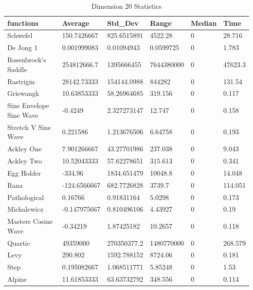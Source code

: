 \documentclass[12pt]{article}
\begin{document}
		\begin{table}[h]
			\centering
			\caption{Dimension 20 Statistics}
			\begin{tabular}{llllll} 
				\hline
				\textbf{functions}      & \textbf{Average} & \textbf{Std\_Dev} & \textbf{Range} & \textbf{Median} & \textbf{Time}  \\ 
				\hline
				Schwefel                & 150.7426667      & 825.6515891       & 4522.28        & 0               & 28.716         \\
				De Jong 1               & 0.001999083      & 0.01094943        & 0.0599725      & 0               & 1.783          \\
				Rosenbrock's Saddle     & 254812666.7      & 1395666455        & 7644380000     & 0               & 47623.3        \\
				Rastrigin               & 28142.73333      & 154144.0988       & 844282         & 0               & 131.54         \\
				Griewangk               & 10.63853333      & 58.26964685       & 319.156        & 0               & 0.117          \\
				Sine Envelope Sine Wave & -0.4249          & 2.327273147       & 12.747         & 0               & 0.158          \\
				Stretch V Sine Wave     & 0.221586         & 1.213676506       & 6.64758        & 0               & 0.193          \\
				Ackley One              & 7.901266667      & 43.27701986       & 237.038        & 0               & 9.043          \\
				Ackley Two              & 10.52043333      & 57.62278651       & 315.613        & 0               & 0.341          \\
				Egg Holder              & -334.96          & 1834.651479       & 10048.8        & 0               & 14.048         \\
				Rana                    & -124.6566667     & 682.7726828       & 3739.7         & 0               & 114.051        \\
				Pathological            & 0.16766          & 0.91831164        & 5.0298         & 0               & 0.173          \\
				Michalewicz             & -0.147975667     & 0.810496106       & 4.43927        & 0               & 0.19           \\
				Masters Cosine Wave  & -0.34219         & 1.87425182        & 10.2657        & 0               & 0.118          \\
				Quartic                 & 49359000         & 270350377.2       & 1480770000     & 0               & 268.579        \\
				Levy                    & 290.802          & 1592.788152       & 8724.06        & 0               & 0.181          \\
				Step                    & 0.195082667      & 1.068511771       & 5.85248        & 0               & 1.53           \\
				Alpine                  & 11.61853333      & 63.63732792       & 348.556        & 0               & 0.114          \\
				\hline
			\end{tabular}
		\end{table}
\end{document}

